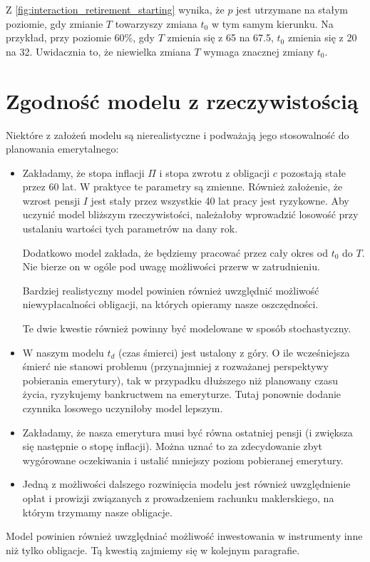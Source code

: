 \documentclass{article}
\begin{document}
Z \autoref{fig:interaction_retirement_starting} wynika, że $p$ jest utrzymane na stałym poziomie, gdy zmianie $T$ towarzyszy zmiana $t_0$ w tym samym kierunku.
Na przykład, przy poziomie 60\%, gdy $T$ zmienia się z 65 na 67.5, $t_0$ zmienia się z 20 na 32.
Uwidacznia to, że niewielka zmiana $T$ wymaga znacznej zmiany $t_0$.

\section{Zgodność modelu z rzeczywistością}
Niektóre z założeń modelu są nierealistyczne i podważają jego stosowalność do planowania emerytalnego:
\begin{itemize}
    \item Zakładamy, że stopa inflacji $\Pi$ i stopa zwrotu z obligacji $c$ pozostają stałe przez 60 lat.
    W praktyce te parametry są zmienne.
    Również założenie, że wzrost pensji $I$ jest stały przez wszystkie 40 lat pracy jest ryzykowne.
    Aby uczynić model bliższym rzeczywistości, należałoby wprowadzić losowość przy ustalaniu wartości tych parametrów na dany rok.
    
    Dodatkowo model zakłada, że będziemy pracować przez cały okres od $t_0$ do $T$.
    Nie bierze on w ogóle pod uwagę możliwości przerw w zatrudnieniu.
    

    Bardziej realistyczny model powinien również uwzględnić możliwość niewypłacalności obligacji, na których opieramy nasze oszczędności.

    Te dwie kwestie również powinny być modelowane w sposób stochastyczny.
    \item W naszym modelu $t_d$ (czas śmierci) jest ustalony z góry.
    O ile wcześniejsza śmierć nie stanowi problemu (przynajmniej z rozważanej perspektywy pobierania emerytury), tak w przypadku dłuższego niż planowany czasu życia, ryzykujemy bankructwem na emeryturze.
    Tutaj ponownie dodanie czynnika losowego uczyniłoby model lepszym.
    \item Zakładamy, że nasza emerytura musi być równa ostatniej pensji (i zwiększa się następnie o stopę inflacji).
    Można uznać to za zdecydowanie zbyt wygórowane oczekiwania i ustalić mniejszy poziom pobieranej emerytury.
    \item Jedną z możliwości dalszego rozwinięcia modelu jest również uwzględnienie opłat i prowizji związanych z prowadzeniem rachunku maklerskiego, na którym trzymamy nasze obligacje.
\end{itemize}
Model powinien również uwzględniać możliwość inwestowania w instrumenty inne niż tylko obligacje.
Tą kwestią zajmiemy się w kolejnym paragrafie.
\end{document}
